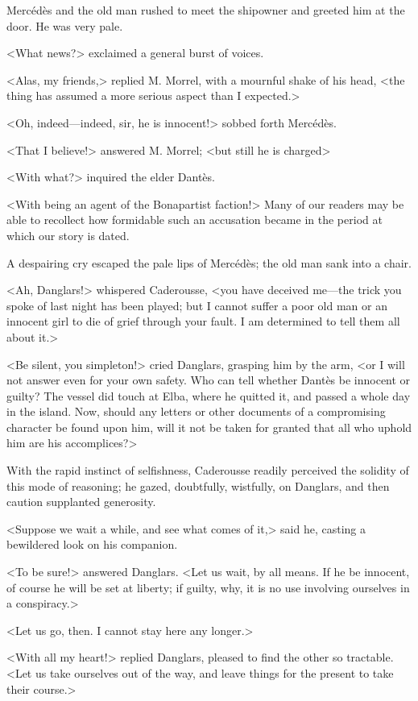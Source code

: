  Mercédès and the old man rushed to meet the shipowner and greeted him at the door. He was very pale. 

 <What news?> exclaimed a general burst of voices. 

 <Alas, my friends,> replied M. Morrel, with a mournful shake of his head, <the thing has assumed a more serious aspect than I expected.> 

 <Oh, indeed—indeed, sir, he is innocent!> sobbed forth Mercédès. 

 <That I believe!> answered M. Morrel; <but still he is charged\longdash> 

 <With what?> inquired the elder Dantès. 

 <With being an agent of the Bonapartist faction!> Many of our readers may be able to recollect how formidable such an accusation became in the period at which our story is dated. 

 A despairing cry escaped the pale lips of Mercédès; the old man sank into a chair. 

 <Ah, Danglars!> whispered Caderousse, <you have deceived me—the trick you spoke of last night has been played; but I cannot suffer a poor old man or an innocent girl to die of grief through your fault. I am determined to tell them all about it.> 

 <Be silent, you simpleton!> cried Danglars, grasping him by the arm, <or I will not answer even for your own safety. Who can tell whether Dantès be innocent or guilty? The vessel did touch at Elba, where he quitted it, and passed a whole day in the island. Now, should any letters or other documents of a compromising character be found upon him, will it not be taken for granted that all who uphold him are his accomplices?> 

 With the rapid instinct of selfishness, Caderousse readily perceived the solidity of this mode of reasoning; he gazed, doubtfully, wistfully, on Danglars, and then caution supplanted generosity. 

 <Suppose we wait a while, and see what comes of it,> said he, casting a bewildered look on his companion. 

 <To be sure!> answered Danglars. <Let us wait, by all means. If he be innocent, of course he will be set at liberty; if guilty, why, it is no use involving ourselves in a conspiracy.> 

 <Let us go, then. I cannot stay here any longer.> 

 <With all my heart!> replied Danglars, pleased to find the other so tractable. <Let us take ourselves out of the way, and leave things for the present to take their course.> 

